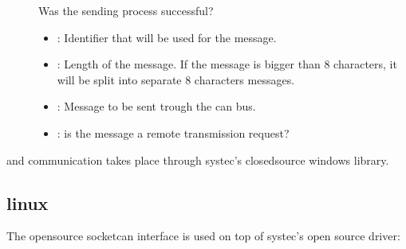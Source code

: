 \documentclass[a4paper,10pt,english]{sphinxmanual}
\begin{document}
\begin{fulllineitems}
\begin{fulllineitems}
\begin{description}
\item[{}] \leavevmode
Was the sending process successful? 

\item[{}] \leavevmode\begin{itemize}
\item {} 
: Identifier that will be used for the message. 

\item {} 
: Length of the message. If the message is bigger than 8 characters, it will be split into separate 8 characters messages. 

\item {} 
: Message to be sent trough the can bus. 

\item {} 
: is the message a remote transmission request? 

\end{itemize}

\end{description}


\end{fulllineitems}


\end{fulllineitems}


and communication takes place through systec’s closed\sphinxhyphen{}source windows library.


\subsection{linux}
\label{\detokenize{vendors/systec:linux}}
The open\sphinxhyphen{}source socketcan interface is used on top of systec’s open source driver:
\end{document}
